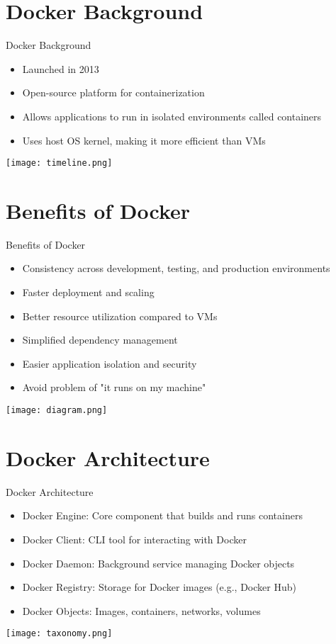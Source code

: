 \documentclass{beamer}
\begin{document}
\section{Docker Background}

\begin{frame}{Docker Background}
    \begin{itemize}
        \item Launched in 2013
        \item Open-source platform for containerization
        \item Allows applications to run in isolated environments called containers
        \item Uses host OS kernel, making it more efficient than VMs
    \end{itemize}
    \texttt{[image: timeline.png]}
\end{frame}

\section{Benefits of Docker}

\begin{frame}{Benefits of Docker}
    \begin{itemize}
        \item Consistency across development, testing, and production environments
        \item Faster deployment and scaling
        \item Better resource utilization compared to VMs
        \item Simplified dependency management
        \item Easier application isolation and security
        \item Avoid problem of "it runs on my machine"
    \end{itemize}
    \texttt{[image: diagram.png]}
\end{frame}

\section{Docker Architecture}

\begin{frame}{Docker Architecture}
    \begin{itemize}
        \item Docker Engine: Core component that builds and runs containers
        \item Docker Client: CLI tool for interacting with Docker
        \item Docker Daemon: Background service managing Docker objects
        \item Docker Registry: Storage for Docker images (e.g., Docker Hub)
        \item Docker Objects: Images, containers, networks, volumes
    \end{itemize}
    \texttt{[image: taxonomy.png]}
\end{frame}
\end{document}
